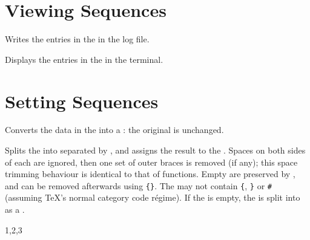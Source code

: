 \documentclass[oneside]{book}
\begin{document}
\section{Viewing Sequences}

\begin{function}{\seqVarLog}
\begin{syntax}
 
\end{syntax}
Writes the entries in the  in the log file.
\begin{codehigh}
\seqVarLog \lFooSomeSeq
\end{codehigh}
\end{function}

\begin{function}{\seqVarShow}
\begin{syntax}
 
\end{syntax}
Displays the entries in the  in the terminal.
\begin{codehigh}
\seqVarShow \lFooSomeSeq
\end{codehigh}
\end{function}

\section{Setting Sequences}

\begin{function}{\seqSetFromClist}
\begin{syntax}
  
\end{syntax}
Converts the data in the  into a :
the original  is unchanged.
\begin{demohigh}
\seqSetFromClist {}
\seqVarJoin {}
\end{demohigh}
\end{function}

\begin{function}{\seqSetSplit}
\begin{syntax}
   
\end{syntax}
Splits the  into  separated
by , and assigns the result to the .
Spaces on both sides of each  are ignored,
then one set of outer braces is removed (if any);
this space trimming behaviour is identical to that of
 functions. Empty  are preserved by
, and can be removed afterwards using
  \verb|{}|.
The  may not contain \verb|{|, \verb|}| or \verb|#|
(assuming \TeX{}'s normal category code r\'egime).
If the  is empty, the  is split
into  as a .
\begin{demohigh}
\seqSetSplit \lTmpaSeq {,} {1,2,3}
\seqVarJoin {}
\end{demohigh}
\end{function}
\end{document}
